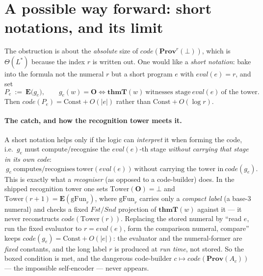 \documentclass[11pt]{article}
\theoremstyle{plain}
\theoremstyle{definition}
\theoremstyle{remark}
\newcommand{\code}[1]{\mathit{code}(#1)}
\newcommand{\thmT}{\mathbf{thmT}}
\newcommand{\Ee}{\mathbf{E}}
\newcommand{\Prov}{\mathbf{Prov}}
\newcommand{\Lstar}{L^{*}}
\begin{document}
\section{A possible way forward: short notations, and its limit}

The obstruction is about the \emph{absolute} size of $\code{\Prov^r(\bot)}$,
which is $\Theta(\Lstar)$ because the index $r$ is written out. One would like a
\emph{short notation}: bake into the formula not the numeral $r$ but a short
program $e$ with $\mathit{eval}(e)=r$, and set
\[
  P_e\ :=\ \Ee\bigl(g_e\bigr),\qquad
  g_e(w)=\mathbf{O}\iff \thmT(w)\ \text{witnesses stage}\ \mathit{eval}(e)\ \text{of the tower}.
\]
Then $\code{P_e}=\mathrm{Const}+O(|e|)$ rather than $\mathrm{Const}+O(\log r)$.

\paragraph{The catch, and how the recognition tower meets it.}
A short notation helps only if the logic can \emph{interpret} it when forming
the code, i.e.\ $g_e$ must compute/recognise the $\mathit{eval}(e)$-th stage
\emph{without carrying that stage in its own code}:
\[
  \boxed{\ g_e\ \text{computes/recognises}\ \mathrm{tower}(\mathit{eval}(e))\ \text{without carrying the tower in}\ \code{g_e}.\ }
\]
This is exactly what a \emph{recogniser} (as opposed to a code-builder) does. In
the shipped recognition tower one sets $\mathrm{Tower}(\mathbf{O})=\bot$ and
$\mathrm{Tower}(r{+}1)=\Ee(\mathrm{gFun}_r)$, where $\mathrm{gFun}_r$ carries only
a \emph{compact label} (a base-$3$ numeral) and checks a fixed $\mathit{Fst}/\mathit{Snd}$
projection of $\thmT(w)$ against it --- it never reconstructs
$\code{\mathrm{Tower}(r)}$. Replacing the stored numeral by ``read $e$, run the
fixed evaluator to $r=\mathit{eval}(e)$, form the comparison numeral, compare''
keeps $\code{g_e}=\mathrm{Const}+O(|e|)$: the evaluator and the numeral-former are
\emph{fixed} constants, and the long label $r$ is produced at \emph{run time},
not stored. So the boxed condition is met, and the dangerous code-builder
$c\mapsto\code{\Prov(A_c)}$ --- the impossible self-encoder --- never appears.
\end{document}
